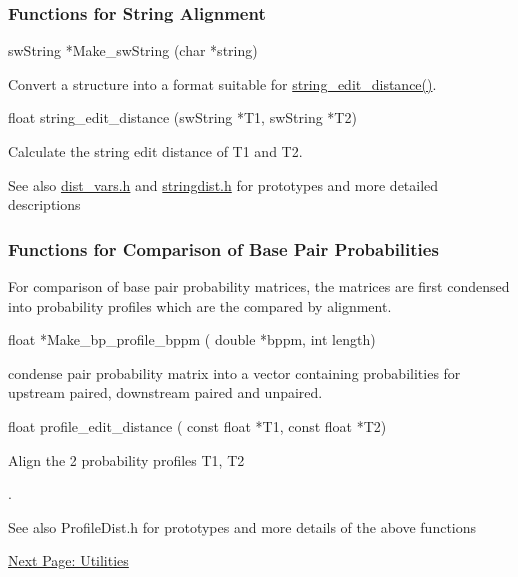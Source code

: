 \subsubsection*{Functions for String Alignment}

\begin{DoxyVerb}
swString *Make_swString (char *string)
\end{DoxyVerb}
 Convert a structure into a format suitable for \hyperlink{stringdist_8h_a89e3c335ef17780576d7c0e713830db9}{string\_\-edit\_\-distance()}. 

\begin{DoxyVerb}
float     string_edit_distance (swString *T1,
                                swString *T2)
\end{DoxyVerb}
 Calculate the string edit distance of T1 and T2. 

\begin{DoxySeeAlso}{See also}
\hyperlink{dist__vars_8h}{dist\_\-vars.h} and \hyperlink{stringdist_8h}{stringdist.h} for prototypes and more detailed descriptions
\end{DoxySeeAlso}
\subsubsection*{Functions for Comparison of Base Pair Probabilities}

For comparison of base pair probability matrices, the matrices are first condensed into probability profiles which are the compared by alignment.

\begin{DoxyVerb}
float *Make_bp_profile_bppm ( double *bppm,
                              int length)
\end{DoxyVerb}
 condense pair probability matrix into a vector containing probabilities for upstream paired, downstream paired and unpaired. 

\begin{DoxyVerb}
float profile_edit_distance ( const float *T1,
                              const float *T2)
\end{DoxyVerb}
 Align the 2 probability profiles T1, T2\par
. 

\begin{DoxySeeAlso}{See also}
ProfileDist.h for prototypes and more details of the above functions
\end{DoxySeeAlso}
\hyperlink{mp__utils}{Next Page: Utilities} 